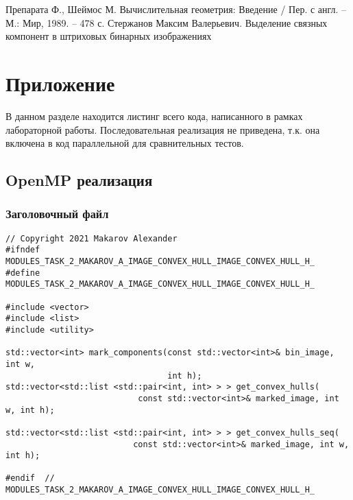\documentclass{report}
\begin{document}
\begin{thebibliography}{1}
 Препарата Ф., Шеймос М. Вычислительная геометрия: Введение / Пер. с англ. – М.: Мир, 1989. – 478 с. 
 Стержанов Максим Валерьевич. Выделение связных компонент в штриховых бинарных изображениях
\end{thebibliography}
\newpage

\section*{Приложение}
В данном разделе находится листинг всего кода, написанного в рамках лабораторной работы. Последовательная реализация не приведена, т.к. она включена в код параллельной для сравнительных тестов.
\subsection*{OpenMP реализация}
\subsubsection*{Заголовочный файл}
\begin{lstlisting}
// Copyright 2021 Makarov Alexander
#ifndef MODULES_TASK_2_MAKAROV_A_IMAGE_CONVEX_HULL_IMAGE_CONVEX_HULL_H_
#define MODULES_TASK_2_MAKAROV_A_IMAGE_CONVEX_HULL_IMAGE_CONVEX_HULL_H_

#include <vector>
#include <list>
#include <utility>

std::vector<int> mark_components(const std::vector<int>& bin_image, int w,
                                 int h);
std::vector<std::list <std::pair<int, int> > > get_convex_hulls(
                           const std::vector<int>& marked_image, int w, int h);

std::vector<std::list <std::pair<int, int> > > get_convex_hulls_seq(
                          const std::vector<int>& marked_image, int w, int h);

#endif  // MODULES_TASK_2_MAKAROV_A_IMAGE_CONVEX_HULL_IMAGE_CONVEX_HULL_H_
\end{lstlisting}
\end{document}

